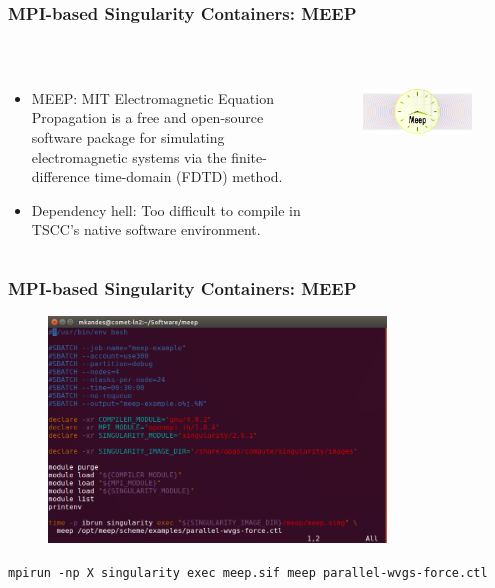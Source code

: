 \documentclass{beamer}
\begin{document}
\begin{frame}
   \frametitle{MPI-based Singularity Containers: MEEP}
   \begin{columns}
      \begin{column}{0.6\textwidth}
         \begin{itemize}
            \setlength\itemsep{1.0em}
            \item MEEP: MIT Electromagnetic Equation Propagation is a 
               free and open-source software package for simulating 
               electromagnetic systems via the finite-difference 
               time-domain (FDTD) method.
            \item Dependency hell: Too difficult to compile in TSCC's 
               native software environment.
         \end{itemize}
      \end{column}
      \hfill
      \begin{column}{0.5\textwidth}
         \begin{figure}[htbp]
            \includegraphics[width=1.0\textwidth]{images/meep-logo.png}
         \end{figure}
      \end{column}
   \end{columns}
\end{frame}

\begin{frame}
   \frametitle{MPI-based Singularity Containers: MEEP}
   \begin{figure}[htbp]
      \includegraphics[width=0.8\textwidth]{images/meep-singularity-mpi-example-batch-job.png}
   \end{figure}
   \lstinline{mpirun -np X singularity exec meep.sif meep parallel-wvgs-force.ctl}
\end{frame}
\end{document}

